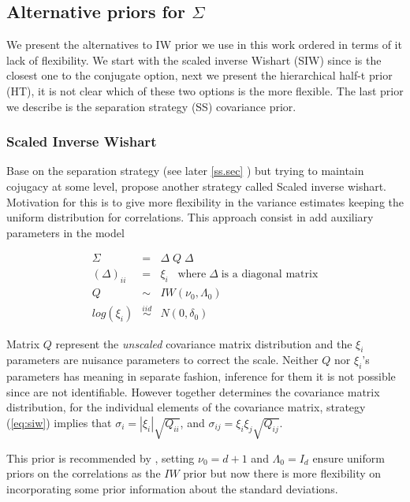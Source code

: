 \documentclass{article}
\begin{document}
\subsection{Alternative priors for $\Sigma$}
We present the alternatives to IW prior we use in this work ordered in terms of it lack of flexibility. We start with the scaled inverse Wishart (SIW) since is the closest one to the conjugate option, next we present the hierarchical half-t prior (HT), it is not clear which of these two options is the more flexible. The last prior we describe is the separation strategy (SS) covariance prior. 
 
\subsubsection{Scaled Inverse Wishart}
Base on the separation strategy (see later \ref{ss.sec} ) but trying to maintain cojugacy at some level, \cite{SIW2008} propose another strategy called Scaled inverse wishart.  Motivation for this is to give more flexibility in the variance estimates keeping the uniform distribution for correlations. This approach consist in add auxiliary parameters in the model

\begin{eqnarray}
\nonumber \Sigma &=& \Delta \; Q \; \Delta \\ 
\nonumber  (\Delta)_{ii} &=& \xi_i \;\; \; \mbox{where} \; \Delta \; \mbox{is a diagonal matrix} \\
\nonumber  Q &  \sim  & IW(\nu_0, \Lambda_0) \\
log(\xi_i) & \stackrel{iid} \sim& N(0, \delta_0)
\label{eq:siw}
\end{eqnarray}

Matrix $Q$ represent the \textsl{unscaled} covariance matrix distribution and the $\xi_i$ parameters are nuisance parameters to correct the scale. Neither $Q$ nor $\xi_i$'s  parameters has meaning in separate fashion, inference for them it is not possible since are not identifiable.  However together determines the covariance matrix distribution, for the individual elements of the covariance matrix, strategy (\ref{eq:siw})  implies that $\sigma_i = |\xi_i|\sqrt{Q_{ii}}$, and $\sigma_{ij}=\xi_i\xi_j\sqrt{Q_{ij}}$.   

This prior is recommended by \cite{gelmanhill}, setting $\nu_0=d+1$ and $\Lambda_0=I_d$ ensure uniform priors on the correlations as the $IW$ prior but now there is more flexibility on incorporating some prior information about the standard deviations.
\end{document}
